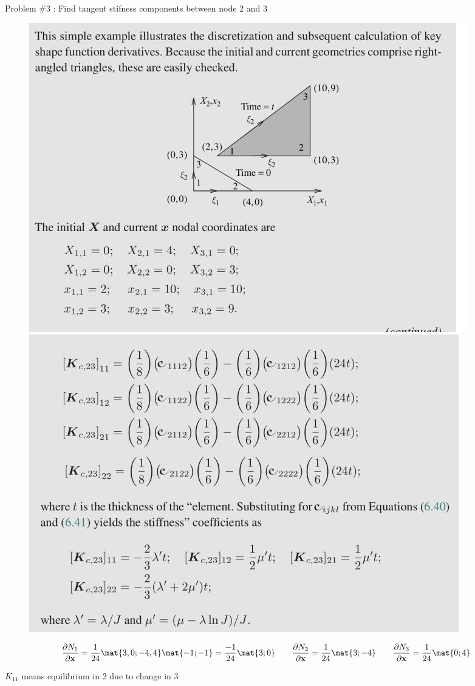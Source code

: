  
 	\begin{frame}{Problem \#3 : Find tangent stifness components between node 2 and 3}
		\begin{figure}
 			\centering
 			\includegraphics[width=0.45\linewidth]{Figure/fig12} 	\includegraphics[width=0.5\linewidth]{Figure/fig13}
 		\end{figure}
 	
 		{\tiny
		\begin{equation}
		 	\begin{aligned}
		 	\frac{\partial N_1}{\partial \ve{x}} = \frac{1}{24}\mat{3,0;-4,4}\mat{-1;-1} = \frac{-1}{24}\mat{3;0} \qquad 	\frac{\partial N_2}{\partial \ve{x}}  = \frac{1}{24}\mat{3;-4} \qquad \frac{\partial N_3}{\partial \ve{x}}  = \frac{1}{24}\mat{0;4}
	 	\end{aligned}
 		\end{equation}}
 	
 	$K_{11}$ means equilibrium in 2 due to change in 3
 	\end{frame}
 

